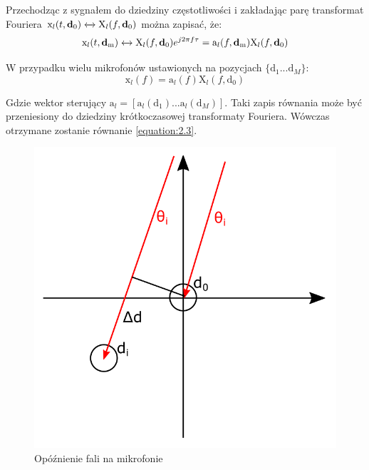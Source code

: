 \noindent Przechodząc z sygnałem do dziedziny częstotliwości i zakładając parę transformat Fouriera $\mathrm{x}_{l}(t,\bm{\mathrm{d}}_{0})\xleftrightarrow{}\mathrm{X}_{l}(f,\bm{\mathrm{d}}_{0})$ można zapisać, że:
\begin{equation}
    \label{equation:2.6}
    \mathrm{x}_{l}(t,\bm{\mathrm{d}}_{\mathrm{m}}) \xleftrightarrow{} \mathrm{X}_{l}(f,\bm{\mathrm{d}}_{0})e^{j 2 \pi f \tau} =
    \mathrm{a}_{l}(f,\bm{\mathrm{d}}_{\mathrm{m}}) \mathrm{X}_{l}(f,\bm{\mathrm{d}}_{0}) 
\end{equation}

\noindent W przypadku wielu mikrofonów ustawionych na pozycjach $\{\bm{\mathrm{d}}_{1}...\bm{\mathrm{d}}_{M} \}$:
\begin{equation}
    \label{equation:2.7}
    \bm{\mathrm{x}}_l(f)=
    \bm{\mathrm{a}}_l(f)\mathrm{X}_{l}(f,\bm{\mathrm{d}}_{0})
\end{equation}

\noindent Gdzie wektor sterujący $\bm{\mathrm{a}}_{l} = [\mathrm{a}_{l}(\bm{\mathrm{d}}_{1})...\mathrm{a}_{l}(\bm{\mathrm{d}}_{M})]$. Taki zapis równania może być przeniesiony do dziedziny krótkoczasowej transformaty Fouriera. Wówczas otrzymane zostanie równanie \eqref{equation:2.3}.

\begin{figure}[h]
    \centering
    \includegraphics[width=\textwidth]{Images/direction.png}
    \caption{Opóźnienie fali na mikrofonie}
    \label{fig:direction}
\end{figure}

